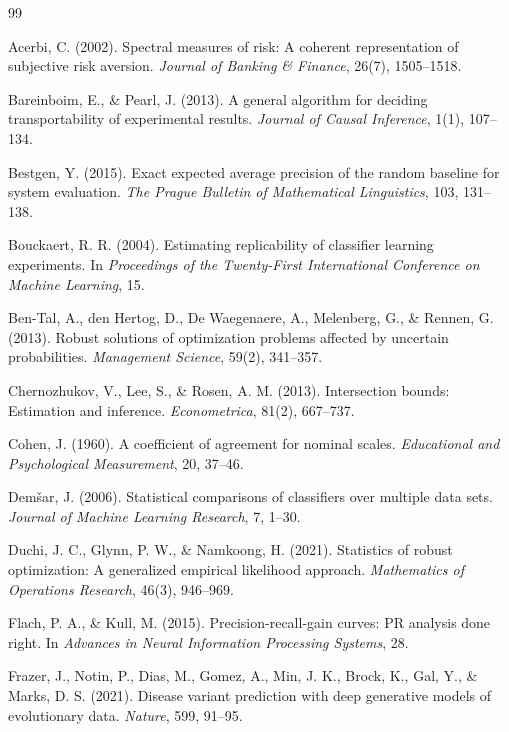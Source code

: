 \documentclass[11pt]{article}
\theoremstyle{remark}
\begin{document}
\begin{thebibliography}{99}
\setlength{\itemsep}{0.25em}

Acerbi, C. (2002).
Spectral measures of risk: A coherent representation of subjective risk aversion.
\emph{Journal of Banking \& Finance}, 26(7), 1505--1518.

Bareinboim, E., \& Pearl, J. (2013).
A general algorithm for deciding transportability of experimental results.
\emph{Journal of Causal Inference}, 1(1), 107--134.

Bestgen, Y. (2015).
Exact expected average precision of the random baseline for system evaluation.
\emph{The Prague Bulletin of Mathematical Linguistics}, 103, 131--138.

Bouckaert, R. R. (2004).
Estimating replicability of classifier learning experiments.
In \emph{Proceedings of the Twenty-First International Conference on Machine Learning}, 15.

Ben-Tal, A., den Hertog, D., De Waegenaere, A., Melenberg, G., \& Rennen, G. (2013).
Robust solutions of optimization problems affected by uncertain probabilities.
\emph{Management Science}, 59(2), 341--357.

Chernozhukov, V., Lee, S., \& Rosen, A. M. (2013).
Intersection bounds: Estimation and inference.
\emph{Econometrica}, 81(2), 667--737.

Cohen, J. (1960).
A coefficient of agreement for nominal scales.
\emph{Educational and Psychological Measurement}, 20, 37--46.

Dem\v{s}ar, J. (2006).
Statistical comparisons of classifiers over multiple data sets.
\emph{Journal of Machine Learning Research}, 7, 1--30.

Duchi, J. C., Glynn, P. W., \& Namkoong, H. (2021).
Statistics of robust optimization: A generalized empirical likelihood approach.
\emph{Mathematics of Operations Research}, 46(3), 946--969.

Flach, P. A., \& Kull, M. (2015).
Precision-recall-gain curves: PR analysis done right.
In \emph{Advances in Neural Information Processing Systems}, 28.

Frazer, J., Notin, P., Dias, M., Gomez, A., Min, J. K., Brock, K., Gal, Y., \& Marks, D. S. (2021).
Disease variant prediction with deep generative models of evolutionary data.
\emph{Nature}, 599, 91--95.


\end{thebibliography}
\end{document}
